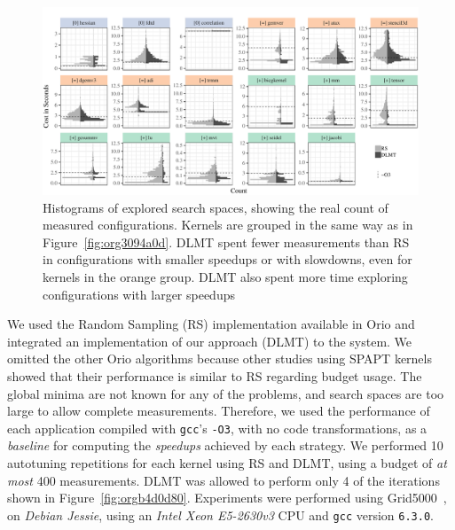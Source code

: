 \documentclass[conference]{IEEEtran}
\begin{document}
\begin{figure}[p]
\centering
\includegraphics[width=\textwidth]{./img/split_histograms.pdf}
\caption{\label{fig:orgb0dfd74}
Histograms of explored search spaces, showing the real count of measured configurations. Kernels are grouped in the same way as in Figure~\ref{fig:org3094a0d}. DLMT spent fewer measurements than RS in configurations with smaller speedups or with slowdowns, even for kernels in the orange group. DLMT also spent more time exploring configurations with larger speedups}
\end{figure}

We used the Random Sampling (RS) implementation available in Orio and integrated
an implementation  of our approach  (DLMT) to the  system. We omitted  the other
Orio      algorithms      because       other      studies      using      SPAPT
kernels~\cite{balaprakash2011can,balaprakash2012experimental} showed  that their
performance is similar  to RS regarding budget usage. The  global minima are not
known for any of the problems, and search spaces are too large to allow complete
measurements. Therefore,  we used the  performance of each  application compiled
with \texttt{gcc}'s  \texttt{-O3}, with no  code transformations, as  a \emph{baseline}
for computing the \emph{speedups} achieved by each strategy. We performed 10 autotuning
repetitions for  each kernel using RS  and DLMT, using  a budget of \emph{at  most} 400
measurements. DLMT  was allowed  to perform  only 4 of  the iterations  shown in
Figure~\ref{fig:orgb4d0d80}.     Experiments      were     performed     using
Grid5000~\cite{balouek2013adding},  on  \emph{Debian  Jessie},   using  an  \emph{Intel  Xeon
E5-2630v3} CPU and \texttt{gcc} version \texttt{6.3.0}.
\end{document}
